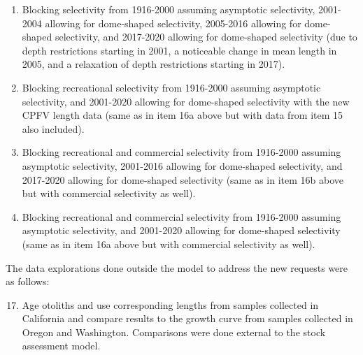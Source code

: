 \documentclass[11pt,
  english,
  a4paper,
]{article}
\begin{document}
\begin{enumerate}
\begin{enumerate}
  \item Blocking selectivity from 1916-2000 assuming asymptotic selectivity, 2001-2004 allowing for dome-shaped selectivity, 2005-2016 allowing for dome-shaped selectivity, and 2017-2020 allowing for dome-shaped selectivity (due to depth restrictions starting in 2001, a noticeable change in mean length in 2005, and a relaxation of depth restrictions starting in 2017).
  
  \item Blocking recreational selectivity from 1916-2000 assuming asymptotic selectivity, and 2001-2020 allowing for dome-shaped selectivity with the new CPFV length data (same as in item 16a above but with data from item 15 also included).
  
  \item Blocking recreational and commercial selectivity from 1916-2000 assuming asymptotic selectivity, 2001-2016 allowing for dome-shaped selectivity, and 2017-2020 allowing for dome-shaped selectivity (same as in item 16b above but with commercial selectivity as well).
  
  \item Blocking recreational and commercial selectivity from 1916-2000 assuming asymptotic selectivity, and 2001-2020 allowing for dome-shaped selectivity (same as in item 16a above but with commercial selectivity as well).
  
  \end{enumerate}

\end{enumerate}


The data explorations done outside the model to address the new requests were as follows:

\leavevmode\tagmcend\tagstructend\par

\begin{enumerate}
\setcounter{enumi}{16}

  \item Age otoliths and use corresponding lengths from samples collected in California and compare results to the growth curve from samples collected in Oregon and Washington. Comparisons were done external to the stock assessment model.

\end{enumerate}

\end{document}
